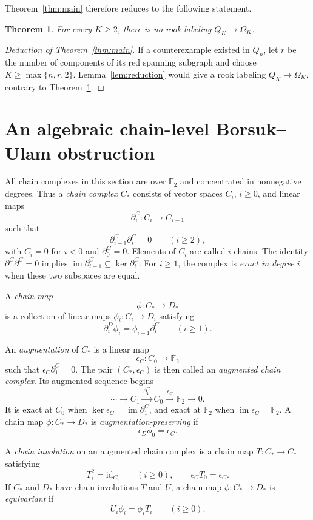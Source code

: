 \documentclass[reqno,12pt]{amsart}
\newtheorem{theorem}{Theorem}[section]
\theoremstyle{definition}
\newcommand{\F}{\mathbb F_2}
\newcommand{\id}{\mathrm{id}}
\begin{document}
Theorem~\ref{thm:main} therefore reduces to the following statement.

\begin{theorem}\label{thm:diagonal-rook}
For every \(K\geq2\), there is no rook labeling
\(Q_K\to\Omega_K\).
\end{theorem}

\begin{proof}[Deduction of Theorem~\ref{thm:main}]
If a counterexample existed in \(Q_n\), let \(r\) be the number of
components of its red spanning subgraph and choose
\(K\geq\max\{n,r,2\}\).  Lemma~\ref{lem:reduction} would give a rook
labeling \(Q_K\to\Omega_K\), contrary to
Theorem~\ref{thm:diagonal-rook}.
\end{proof}

\section{An algebraic chain-level Borsuk--Ulam obstruction}


All chain complexes in this section are over \(\F\) and concentrated
in nonnegative degrees.  Thus a
\emph{chain complex} \(C_*\) consists of vector spaces \(C_i\),
\(i\geq0\), and linear maps
\[
 \partial_i^C:C_i\longrightarrow C_{i-1}
\]
such that
\[
 \partial_{i-1}^C\partial_i^C=0
 \qquad(i\geq2),
\]
with \(C_i=0\) for \(i<0\) and \(\partial_0^C=0\).  Elements of
\(C_i\) are called \(i\)-chains.  The identity
\(\partial^C\partial^C=0\) implies
\(\operatorname{im}\partial_{i+1}^C\subseteq\ker\partial_i^C\).
For \(i\geq1\), the complex is \emph{exact in degree \(i\)} when
these two subspaces are equal.

A \emph{chain map}
\[
 \phi:C_*\longrightarrow D_*
\]
is a collection of linear maps \(\phi_i:C_i\to D_i\) satisfying
\[
 \partial_i^D\phi_i=\phi_{i-1}\partial_i^C
 \qquad(i\geq1).
\]

An \emph{augmentation} of \(C_*\) is a linear map
\[
 \epsilon_C:C_0\longrightarrow\F
\]
such that \(\epsilon_C\partial_1^C=0\).  The pair
\((C_*,\epsilon_C)\) is then called an \emph{augmented chain
complex}.  Its augmented sequence begins
\[
 \cdots\longrightarrow C_1
 \xrightarrow{\ \partial_1^C\ }C_0
 \xrightarrow{\ \epsilon_C\ }\F
 \longrightarrow0.
\]
It is exact at \(C_0\) when
\(\ker\epsilon_C=\operatorname{im}\partial_1^C\), and exact at
\(\F\) when \(\operatorname{im}\epsilon_C=\F\).  A chain map
\(\phi:C_*\to D_*\) is \emph{augmentation-preserving} if
\[
 \epsilon_D\phi_0=\epsilon_C.
\]

A \emph{chain involution} on an augmented chain complex is a chain
map \(T:C_*\to C_*\) satisfying
\[
 T_i^2=\id_{C_i}\qquad(i\geq0),
 \qquad
 \epsilon_CT_0=\epsilon_C.
\]
If \(C_*\) and \(D_*\) have chain involutions \(T\) and \(U\), a
chain map \(\phi:C_*\to D_*\) is \emph{equivariant} if
\[
 U_i\phi_i=\phi_iT_i\qquad(i\geq0).
\]
\end{document}
